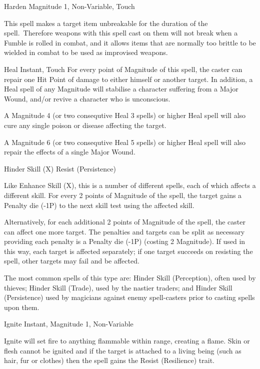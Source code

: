 \begin{rpg-spell}
{Harden}
{Magnitude 1, Non-Variable, Touch}

This spell makes a target item unbreakable for the duration of the spell. Therefore weapons with this spell cast on them will not break when a Fumble is rolled in combat, and it allows items that are normally too brittle to be wielded in combat to be used as improvised weapons.
\end{rpg-spell}


\begin{rpg-spell}
{Heal}
{Instant, Touch}
For every point of Magnitude of this spell, the caster can repair one Hit Point of damage to either himself or another target. In addition, a Heal spell of any Magnitude will stabilise a character suffering from a Major Wound, and/or revive a character who is unconscious. 

A Magnitude 4 (or two consequtive Heal 3 spells) or higher Heal spell will also cure any single poison or disease affecting the target. 

A Magnitude 6 (or two consequtive Heal 5 spells) or higher Heal spell will also repair the effects of a single Major Wound.
\end{rpg-spell}


\begin{rpg-spell}
{Hinder Skill (X)}
{Resist (Persistence)}

Like Enhance Skill (X), this is a number of different spells, each of which affects a different skill. For every 2 points of Magnitude of the spell, the target gains a Penalty die (-1P) to the next skill test using the affected skill.

Alternatively, for each additional 2 points of Magnitude of the spell, the caster can affect one more target.  The penalties and targets can be split as necessary providing each penalty is a Penalty die (-1P) (costing 2 Magnitude). If used in this way, each target is affected separately; if one target succeeds on resisting the spell, other targets may fail and be affected.

The most common spells of this type are: Hinder Skill (Perception), often used by thieves; Hinder Skill (Trade), used by the nastier traders; and Hinder Skill (Persistence) used by magicians against enemy spell-casters prior to casting spells upon them.
\end{rpg-spell}


\begin{rpg-spell}
{Ignite}
{Instant, Magnitude 1, Non-Variable}

Ignite will set fire to anything flammable within range, creating a flame. Skin or flesh cannot be ignited and if the target is attached to a living being (such as hair, fur or clothes) then the spell gains the Resist (Resilience) trait. 
\end{rpg-spell}


